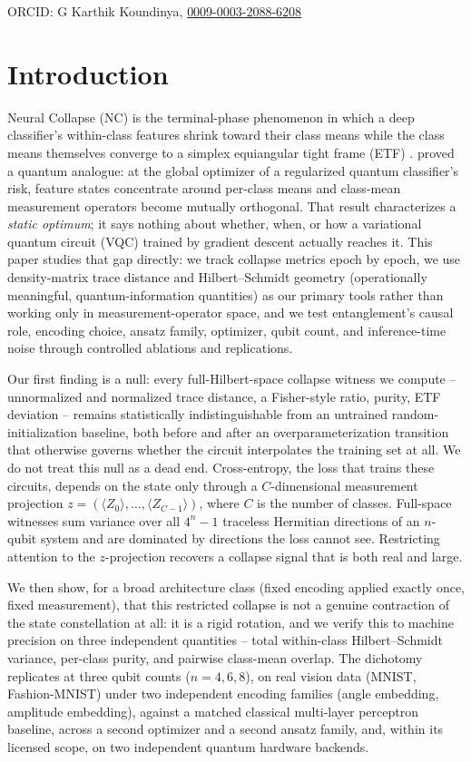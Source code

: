 \documentclass[pdflatex,sn-mathphys-ay]{sn-jnl}
\theoremstyle{thmstyleone}
\theoremstyle{thmstyletwo}
\begin{document}
\noindent ORCID: G Karthik Koundinya, \href{https://orcid.org/0009-0003-2088-6208}{0009-0003-2088-6208}

\section{Introduction}
\label{sec:intro}

Neural Collapse (NC) is the terminal-phase phenomenon in which a deep classifier's within-class features shrink toward their class means while the class means themselves converge to a simplex equiangular tight frame (ETF) \citep{papyan2020}. \citet{du2023} proved a quantum analogue: at the global optimizer of a regularized quantum classifier's risk, feature states concentrate around per-class means and class-mean measurement operators become mutually orthogonal. That result characterizes a \emph{static optimum}; it says nothing about whether, when, or how a variational quantum circuit (VQC) trained by gradient descent actually reaches it. This paper studies that gap directly: we track collapse metrics epoch by epoch, we use density-matrix trace distance and Hilbert--Schmidt geometry (operationally meaningful, quantum-information quantities) as our primary tools rather than working only in measurement-operator space, and we test entanglement's causal role, encoding choice, ansatz family, optimizer, qubit count, and inference-time noise through controlled ablations and replications.

Our first finding is a null: every full-Hilbert-space collapse witness we compute -- unnormalized and normalized trace distance, a Fisher-style ratio, purity, ETF deviation -- remains statistically indistinguishable from an untrained random-initialization baseline, both before and after an overparameterization transition that otherwise governs whether the circuit interpolates the training set at all. We do not treat this null as a dead end. Cross-entropy, the loss that trains these circuits, depends on the state only through a $C$-dimensional measurement projection $z = (\langle Z_0\rangle,\ldots,\langle Z_{C-1}\rangle)$, where $C$ is the number of classes. Full-space witnesses sum variance over all $4^n-1$ traceless Hermitian directions of an $n$-qubit system and are dominated by directions the loss cannot see. Restricting attention to the $z$-projection recovers a collapse signal that is both real and large.

We then show, for a broad architecture class (fixed encoding applied exactly once, fixed measurement), that this restricted collapse is not a genuine contraction of the state constellation at all: it is a rigid rotation, and we verify this to machine precision on three independent quantities -- total within-class Hilbert--Schmidt variance, per-class purity, and pairwise class-mean overlap. The dichotomy replicates at three qubit counts ($n=4,6,8$), on real vision data (MNIST, Fashion-MNIST) under two independent encoding families (angle embedding, amplitude embedding), against a matched classical multi-layer perceptron baseline, across a second optimizer and a second ansatz family, and, within its licensed scope, on two independent quantum hardware backends.
\end{document}
